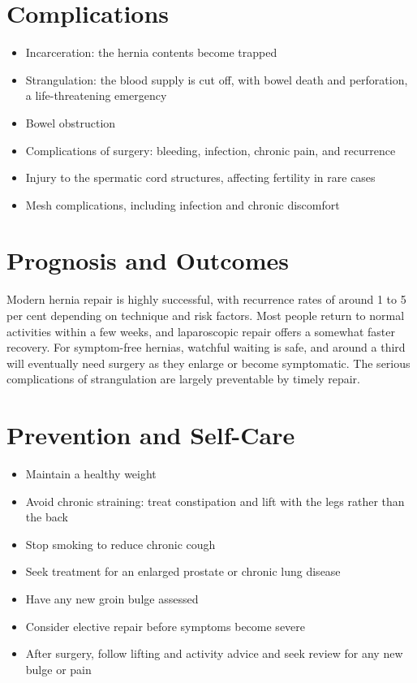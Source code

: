 \section*{Complications}
\begin{itemize}
    \item Incarceration: the hernia contents become trapped
    \item Strangulation: the blood supply is cut off, with bowel death and perforation, a life-threatening emergency
    \item Bowel obstruction
    \item Complications of surgery: bleeding, infection, chronic pain, and recurrence
    \item Injury to the spermatic cord structures, affecting fertility in rare cases
    \item Mesh complications, including infection and chronic discomfort
\end{itemize}

\section*{Prognosis and Outcomes}
Modern hernia repair is highly successful, with recurrence rates of around 1 to 5 per cent depending on technique and risk factors. Most people return to normal activities within a few weeks, and laparoscopic repair offers a somewhat faster recovery. For symptom-free hernias, watchful waiting is safe, and around a third will eventually need surgery as they enlarge or become symptomatic. The serious complications of strangulation are largely preventable by timely repair.

\section*{Prevention and Self-Care}
\begin{itemize}
    \item Maintain a healthy weight
    \item Avoid chronic straining: treat constipation and lift with the legs rather than the back
    \item Stop smoking to reduce chronic cough
    \item Seek treatment for an enlarged prostate or chronic lung disease
    \item Have any new groin bulge assessed
    \item Consider elective repair before symptoms become severe
    \item After surgery, follow lifting and activity advice and seek review for any new bulge or pain
\end{itemize}

